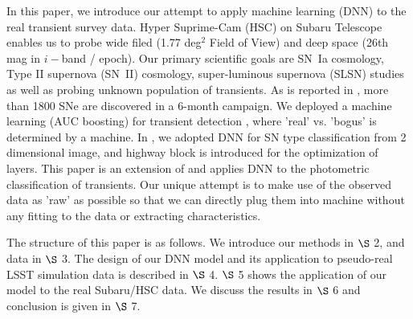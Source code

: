 \documentclass[useamsfonts]{pasj01}
\begin{document}
In this paper, we introduce our attempt to apply machine learning (DNN) to the real transient survey data.
Hyper Suprime-Cam (HSC) on Subaru Telescope enables us to probe wide filed (1.77 deg$^2$ Field of View) and deep space (26th mag in $i-$band / epoch).  Our primary scientific goals are SN~Ia cosmology, Type II supernova (SN~II) cosmology, super-luminous supernova (SLSN) studies as well as probing unknown population of transients.  
As is reported in \citet{yasuda19a}, more than 1800 SNe are discovered in a 6-month campaign. 
We deployed a machine learning (AUC boosting) for transient detection \citep{morii16a}, where 'real' vs. 'bogus' is determined by a machine.
In \citet{kimura17a}, we adopted DNN for SN type classification from 2 dimensional image, and highway block is introduced for the optimization of layers.
This paper is an extension of \citet{kimura17a} and applies DNN to the photometric classification of transients.   
Our unique attempt is to make use of the observed data as 'raw' as possible so that we can directly plug them into machine without any fitting to the data or extracting characteristics.

The structure of this paper is as follows. We introduce our methods in $\S$ 2, and data in $\S$ 3. The design of our DNN model and its application to pseudo-real LSST simulation data is described in $\S$ 4. $\S$ 5 shows the application of our model to the real Subaru/HSC data. We discuss the results in $\S$ 6 and conclusion is given in $\S$ 7.
 
\end{document}
